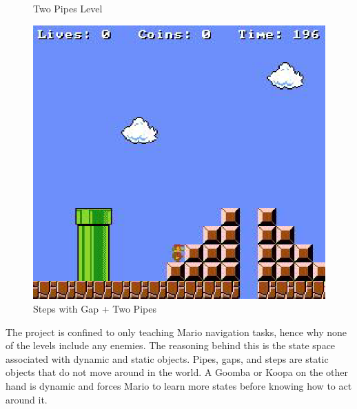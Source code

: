 \documentclass[notitlepage,a4paper,11pt]{article}
\begin{document}
\begin{figure}[!htb]
  \caption{Two Pipes Level}\label{fig:}
\endminipage\hfill
{}%
  \includegraphics[width=\linewidth]{figs/steps_pipe_level.eps}
  \caption{Steps with Gap + Two Pipes}\label{fig:awesome_image3}
\endminipage
\end{figure}

The project is confined to only teaching Mario navigation tasks, hence why none of the levels include any enemies. The reasoning behind this is the state space associated with dynamic and static objects. Pipes, gaps, and steps are static objects that do not move around in the world. A Goomba or Koopa on the other hand is dynamic and forces Mario to learn more states before knowing how to act around it.
\end{document}
